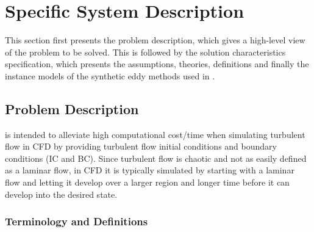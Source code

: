 \documentclass[12pt]{article}
\begin{document}

\section{Specific System Description}

This section first presents the problem description, which gives a high-level
view of the problem to be solved.  This is followed by the solution characteristics
specification, which presents the assumptions, theories, definitions and finally
the instance models of the synthetic eddy methods used in \progname{}.  

\subsection{Problem Description} \label{Sec_pd}

\progname{} is intended to alleviate high computational cost/time when simulating turbulent flow in CFD by providing turbulent flow initial conditions and boundary conditions (IC and BC). Since turbulent flow is chaotic and not as easily defined as a laminar flow, in CFD it is typically simulated by starting with a laminar flow and letting it develop over a larger region and longer time before it can develop into the desired state.

\subsubsection{Terminology and  Definitions} \label{sec_termDef}

\end{document}
